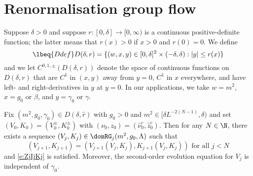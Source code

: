 
\section{Renormalisation group flow}

Suppose $\delta > 0$ and suppose $r : [0, \delta] \to [0, \infty)$
is a continuous positive-definite function; the latter
means that $r(x) > 0$ if $x > 0$ and $r(0) = 0$.
We define
\begin{equation}
\lbeq{Ddef}
D(\delta, r)
    =
\{ (w, x, y) \in [0, \delta]^2 \times (-\delta, \delta) : |y| \leq r(x) \}
\end{equation}
and we let $C^{0,1,\pm}(D(\delta, r))$ denote the space of continuous functions on $D(\delta, r)$
that are $C^1$ in $(x, y)$ away from $y = 0$, $C^1$ in $x$ everywhere,
and have left- and right-derivatives in $y$ at $y = 0$.
In our applications, we take $w = m^2$, $x = g_0$ or $\beta$,
and $y = \gamma_0$ or $\gamma$.

\begin{theorem}
\label{thm:rhatflow}
Fix $(m^2, g_0, \gamma_0) \in D(\delta, \hat r)$ with $g_0 > 0$ and
$m^2 \in [\delta L^{-2 (N - 1)}, \delta)$ and
set $(V_0, K_0) = (V^\pm_0, K^\pm_0)$
with $(\nu_0, z_0) = (\hat\nu_0^c, \hat z_0^c)$.
Then for any $N \in \N$,
there exists a sequence $(V_j, K_j) \in \domRG_j(m^2, g_0, \Lambda)$
such that
\begin{equation}
  \label{e:VjKjDj-hat}
  (V_{j+1},K_{j+1}) = (V_{j+1}(V_j, K_j), K_{j+1}(V_j, K_j)) \text{ for all } j < N
\end{equation}
and \eqref{e:ZjIjKj} is satisfied.
Moreover, the second-order evolution equation for $V_j$ is independent of $\gamma_0$.
\end{theorem}